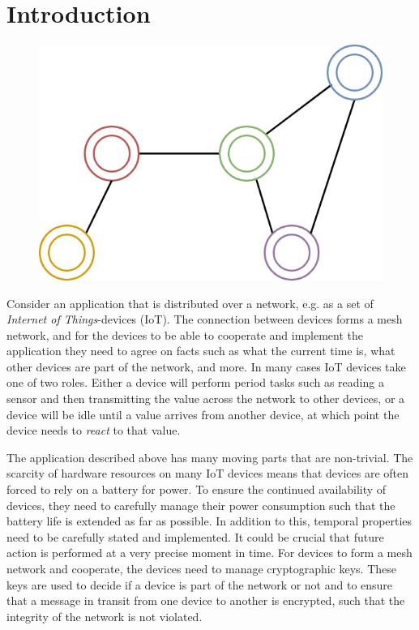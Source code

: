 \chapter{Introduction}
\label{chap:introduction}

\begin{figure}[h]
    \centering
    \includegraphics[scale=0.2]{graphics/mesh.png}
\end{figure}

Consider an application that is distributed over a network, e.g. as a set of \textit{Internet of Things}-devices (IoT). The
connection between devices forms a mesh network, and for the devices to be able to cooperate and implement the application they
need to agree on facts such as what the current time is, what other devices are part of the network, and more. In many cases
IoT devices take one of two roles. Either a device will perform period tasks such as reading a sensor and then transmitting
the value across the network to other devices, or a device will be idle until a value arrives from another device, at which point
the device needs to \textit{react} to that value.

The application described above has many moving parts that are non-trivial. The scarcity of hardware resources on many IoT
devices means that devices are often forced to rely on a battery for power. To ensure the continued availability of devices,
they need to carefully manage their power consumption such that the battery life is extended as far as possible. In addition to 
this, temporal properties need to be carefully stated and implemented. It could be crucial that future action is
performed at a very precise moment in time. For devices to form a mesh network
and cooperate, the devices need to manage cryptographic keys. These keys are used to decide if a device is part of the network
or not and to ensure that a message in transit from one device to another is encrypted, such that the integrity of the network
is not violated.

